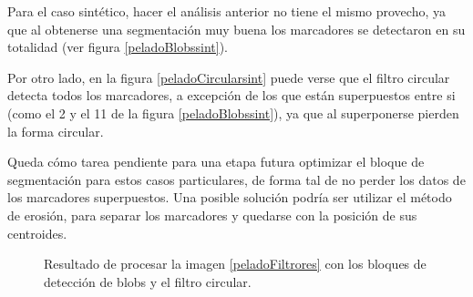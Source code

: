 Para el caso sintético, hacer el análisis anterior no tiene el mismo provecho, ya que al obtenerse una segmentación muy buena los marcadores se detectaron en su totalidad (ver figura \ref{peladoBlobssint}). 

Por otro lado, en la figura \ref{peladoCircularsint} puede verse que el filtro circular detecta todos los marcadores, a excepción de los que están superpuestos entre si (como el 2 y el 11 de la figura \ref{peladoBlobssint}), ya que al superponerse pierden la forma circular.

 Queda cómo tarea pendiente para una etapa futura optimizar el bloque de segmentación para estos casos particulares, de forma tal de no perder los datos de los marcadores superpuestos. Una posible solución podría ser utilizar el método de erosión, para separar los marcadores y quedarse con la posición de sus centroides.

\begin{figure}[H]
        \centering
        \hspace{3 mm}
  \caption{Resultado de procesar la imagen \ref{peladoFiltrores} con los bloques de detección de blobs y el filtro circular.}
      \label{detectMarcadoresSinteticos}
\end{figure}

